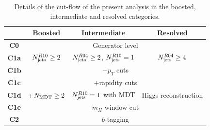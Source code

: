 \begin{table}[t]
  \centering
  \begin{tabular}{|c|c|c|c|}
\hline
&  Boosted  &   Intermediate &  Resolved  \\
\hline
\hline
{\bf C0} &  \multicolumn{3}{c|}{Generator level} \\
\hline
{\bf C1a} & $N_{\rm jets}^{R10}\ge 2$ & $N_{\rm jets}^{R04}\ge 2$, $N_{\rm jets}^{R10}=1$  &
$N_{\rm jets}^{R04}\ge 4$ \\
\hline
{\bf  C1b} & \multicolumn{3}{c|}{+$p_T$ cuts} \\
{\bf C1c} & \multicolumn{3}{c|}{+rapidity cuts}\\
\hline
 {\bf C1d} & +$N_{\rm MDT}\ge 2$ & $N_{\rm jets}^{R10}=1$ with MDT  &
 Higgs reconstruction \\
 \hline
{\bf C1e} & \multicolumn{3}{c|}{ $m_H$ window cut} \\
\hline
{\bf C2} & \multicolumn{3}{c|}{$b$-tagging}    \\
\hline
  \end{tabular}
  \caption{\small Details of the cut-flow of the present analysis in the boosted, intermediate
    and resolved categories.
      \label{tab:cutflowdetails}
  }
\end{table}


